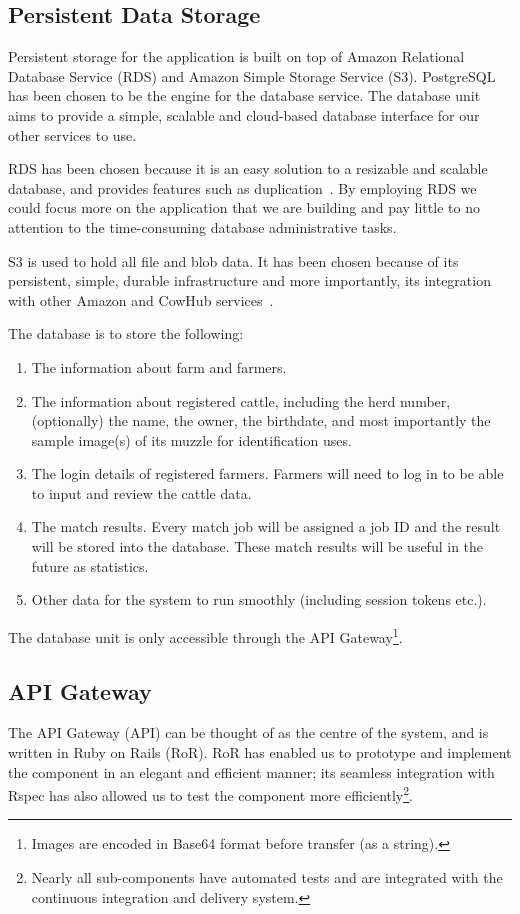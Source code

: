 \subsection{Persistent Data Storage}
Persistent storage for the application is built on top of Amazon Relational Database Service (RDS) and Amazon Simple Storage Service (S3). PostgreSQL has been chosen to be the engine for the database service. The database unit aims to provide a simple, scalable and cloud-based database interface for our other services to use.

RDS has been chosen because it is an easy solution to a resizable and scalable database, and provides features such as duplication~\cite{rds}. By employing RDS we could focus more on the application that we are building and pay little to no attention to the time-consuming database administrative tasks.

S3 is used to hold all file and blob data. It has been chosen because of its persistent, simple, durable infrastructure and more importantly, its integration with other Amazon and CowHub services~\cite{s3}.

The database is to store the following:

\begin{enumerate}
	\item The information about farm and farmers.
	\item The information about registered cattle, including the herd number, (optionally) the name, the owner, the birthdate, and most importantly the sample image(s) of its muzzle for identification uses.
	\item The login details of registered farmers. Farmers will need to log in to be able to input and review the cattle data.
	\item The match results. Every match job will be assigned a job ID and the result will be stored into the database. These match results will be useful in the future as statistics.
	\item Other data for the system to run smoothly (including session tokens etc.).
\end{enumerate}

The database unit is only accessible through the API Gateway\footnote{Images are encoded in Base64 format before transfer (as a string).}.

\subsection{API Gateway}
The API Gateway (API) can be thought of as the centre of the system, and is written in Ruby on Rails (RoR). RoR has enabled us to prototype and implement the component in an elegant and efficient manner; its seamless integration with Rspec has also allowed us to test the component more efficiently\footnote{Nearly all sub-components have automated tests and are integrated with the continuous integration and delivery system.}.

